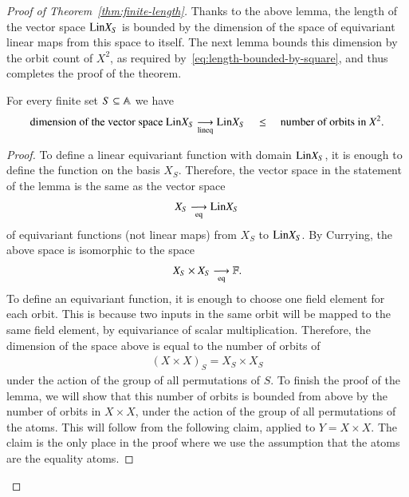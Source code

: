\begin{proof}[Proof of Theorem~\ref{thm:finite-length}]
    Thanks to the above lemma, the length of the vector space $\mathrm{Lin} X_S$ is bounded by the dimension of the space of equivariant linear maps from this space  to itself. The next lemma bounds this dimension by the orbit count of $X^2$, as required by~\eqref{eq:length-bounded-by-square}, and thus  completes the    proof of the theorem. 

    \begin{lemma}\label{lem:bound-on-dim-for-finite-set} 
        For every finite set $S \subseteq \mathbb A$ we have 
        \begin{align*}
        \text{dimension of the vector space }\mathrm{Lin} X_S \underset{\text{lineq}}{\longrightarrow} \mathrm{Lin} X_S \quad  \leq \quad  \text{number of orbits in $X^2$.}
        \end{align*}
    \end{lemma}
    \begin{proof}
        To define a  linear equivariant function with domain $\mathrm{Lin} X_S$, it is enough to define the function on the basis $X_S$. Therefore, the vector space in the statement of the lemma is the same as the vector space  
        \begin{align*}
            X_S \underset{\text{eq}}{\longrightarrow} \mathrm{Lin} X_S
        \end{align*}
        of equivariant functions (not linear maps) from $X_S$ to $\mathrm{Lin} X_S$.  By Currying, the above space is isomorphic to  the space 
        \begin{align*}
        X_S \times X_S \underset{\text{eq}}{\longrightarrow} \mathbb F.
        \end{align*}
        To define an equivariant function, it is enough to choose one field element for each orbit. This is because two inputs in the same orbit will be mapped to the same field element, by equivariance of scalar multiplication.  Therefore, the dimension of the space above is equal to the number of orbits of
        \begin{align*}
        (X \times X)_S = X_S \times X_S
        \end{align*}
        under the action of the group of all permutations of $S$. To finish the proof of the lemma, we will show that this number of orbits is bounded from above by the number of orbits in $X \times X$, under the action of the group of  all permutations of the atoms. This will follow from the    following claim, applied to $Y = X \times X$. The claim is the only place in the proof where we use the assumption that the atoms are the equality atoms.


\end{proof}
\end{proof}

